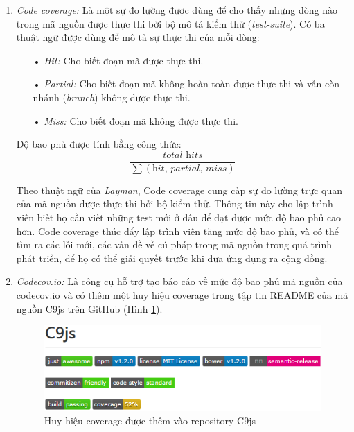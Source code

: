 \documentclass[12pt,a4paper]{article}
\begin{document}
\begin{enumerate}
\item \emph{Code coverage:}
Là một sự đo lường được dùng để cho thấy những dòng nào trong mã nguồn được thực thi bởi bộ mô tả kiểm thử (\textit{test-suite}). Có ba thuật ngữ được dùng để mô tả sự thực thi của mỗi dòng:

\begin{itemize}
\item[•] \emph{Hit:} Cho biết đoạn mã được thực thi.
\item[•] \emph{Partial:} Cho biết đoạn mã không hoàn toàn được thực thi và vẫn còn nhánh (\textit{branch}) không được thực thi.
\item[•] \emph{Miss:} Cho biết đoạn mã không được thực thi.
\end{itemize}

Độ bao phủ được tính bằng công thức:
\[
    \frac{\textit{total hits}}{\sum{(\textit{hit, partial, miss})}}
\]

Theo thuật ngữ của \textit{Layman}\citep{codecov_wiki}, Code coverage cung cấp sự đo lường trực quan của mã nguồn được thực thi bởi bộ kiểm thử. Thông tin này cho lập trình viên biết họ cần viết những test mới ở đâu để đạt được mức độ bao phủ cao hơn. Code coverage thúc đẩy lập trình viên tăng mức độ bao phủ, và có thể tìm ra các lỗi mới, các vấn đề về cú pháp trong mã nguồn trong quá trình phát triển, để họ có thể giải quyết trước khi đưa ứng dụng ra cộng đồng. \\

\item \emph{Codecov.io:}
Là công cụ hỗ trợ tạo báo cáo về mức độ bao phủ mã nguồn của codecov.io và có thêm một huy hiệu coverage trong tập tin \textsf{README} của mã nguồn C9js trên GitHub (Hình \ref{fig:codecovio}). 

\begin{figure}[!h]
	\begin{center}
    \includegraphics[scale=1]{image/codecovio}
    \caption{Huy hiệu coverage được thêm vào repository C9js}
    \label{fig:codecovio}
	\end{center}
\end{figure}


\end{enumerate}
\end{document}
